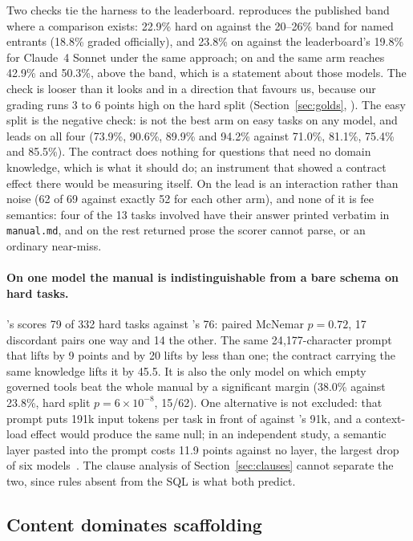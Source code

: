 Two checks tie the harness to the leaderboard. \armM{} reproduces the
published band where a comparison exists: 22.9\% hard on \mGLM{} against
the 20--26\% band for named entrants (18.8\% graded officially), and 23.8\%
on \mSON{} against the leaderboard's 19.8\% for Claude~4 Sonnet under the
same approach; on \mDS{} and \mGPT{} the same arm reaches 42.9\% and
50.3\%, above the band, which is a statement about those models. The check
is looser than it looks and in a direction that favours us, because our
grading runs 3 to 6 points high on the hard split (Section~\ref{sec:golds},
). The easy split is the negative check: \armC{} is not
the best arm on easy tasks on any model, and \armM{} leads on all four
(73.9\%, 90.6\%, 89.9\% and 94.2\% against 71.0\%, 81.1\%, 75.4\% and
85.5\%). The contract does nothing for questions that need no domain
knowledge, which is what it should do; an instrument that showed a contract
effect there would be measuring itself. On \mSON{} the lead is an
interaction rather than noise (62 of 69 against exactly 52 for each other
arm), and none of it is fee semantics: four of the 13 tasks involved have
their answer printed verbatim in \texttt{manual.md}, and on the rest \armC{}
returned prose the scorer cannot parse, or an ordinary near-miss.

\paragraph{On one model the manual is indistinguishable from a bare schema
on hard tasks.} \mSON{}'s \armM{} scores 79 of 332 hard tasks against
\armS{}'s 76: paired McNemar $p{=}0.72$, 17 discordant pairs one way and 14
the other. The same 24{,}177-character prompt that lifts \mGLM{} by 9 points
and \mDS{} by 20 lifts \mSON{} by less than one; the contract carrying the
same knowledge lifts it by 45.5. It is also the only model on which empty
governed tools beat the whole manual by a significant margin (38.0\%
against 23.8\%, hard split $p{=}6{\times}10^{-8}$, 15/62). One alternative is not excluded: that prompt
puts 191k input tokens per task in front of \mSON{} against \armS{}'s 91k,
and a context-load effect would produce the same null; in an independent
study, a semantic layer pasted into the prompt costs \mSON{} 11.9 points
against no layer, the largest drop of six models~\cite{evoontology}. The
clause analysis of Section~\ref{sec:clauses} cannot separate the two, since
rules absent from the SQL is what both predict.

\subsection{Content dominates scaffolding}
\label{sec:decomposition}

